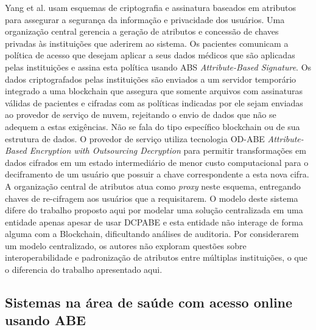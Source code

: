 \documentclass[a4paper,11pt]{article}
\begin{document}
Yang et al. \cite{Yang2020} usam esquemas de criptografia e assinatura baseados em atributos para assegurar a segurança da informação e privacidade dos usuários.
Uma organização central gerencia a geração de atributos e concessão de chaves privadas às instituições que aderirem ao sistema.
Os pacientes comunicam a política de acesso que desejam aplicar a seus dados médicos que são aplicadas pelas instituições e assina esta política usando ABS \emph{Attribute-Based Signature}.
Os dados criptografados pelas instituições são enviados a um servidor temporário integrado a uma blockchain que assegura que somente arquivos com assinaturas válidas de pacientes e cifradas com as políticas indicadas por ele sejam enviadas ao provedor de serviço de nuvem, rejeitando o envio de dados que não se adequem a estas exigências.
Não se fala do tipo específico blockchain ou de sua estrutura de dados.
O provedor de serviço utiliza tecnologia OD-ABE \emph{Attribute-Based Encryption with Outsourcing Decryption} para permitir transformações em dados cifrados em um estado intermediário de menor custo computacional para o deciframento de um usuário que possuir a chave correspondente a esta nova cifra.
A organização central de atributos atua como \emph{proxy} neste esquema, entregando chaves de re-cifragem aos usuários que a requisitarem.
O modelo deste sistema difere do trabalho proposto aqui por modelar uma solução centralizada em uma entidade apenas apesar de usar DCPABE e esta entidade não interage de forma alguma com a Blockchain, dificultando análises de auditoria.
Por considerarem um modelo centralizado, os autores não exploram questões sobre interoperabilidade e padronização de atributos entre múltiplas instituições, o que o diferencia do trabalho apresentado aqui.

\subsection{Sistemas na área de saúde com acesso online usando ABE}
\label{sec:sub:saude-nuvem-cba}
\end{document}
